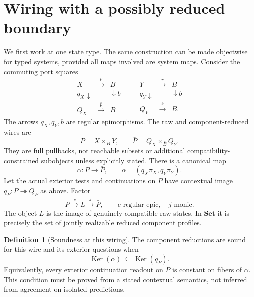 \documentclass[11pt]{article}
\theoremstyle{definition}
\newtheorem{definition}[theorem]{Definition}
\theoremstyle{remark}\newtheorem{remark}[theorem]{Remark}
\newcommand{\Ker}{\operatorname{Ker}}
\begin{document}
\section{Wiring with a possibly reduced boundary}
We first work at one state type. The same construction can be made
objectwise for typed systems, provided all maps involved are system maps.
Consider the commuting port squares
\[
\begin{array}{ccc}
X&\xrightarrow{p}&B\\
{\scriptstyle q_X}\downarrow&&\downarrow{\scriptstyle b}\\
Q_X&\xrightarrow{\bar p}&\bar B
\end{array}
\qquad
\begin{array}{ccc}
Y&\xrightarrow{r}&B\\
{\scriptstyle q_Y}\downarrow&&\downarrow{\scriptstyle b}\\
Q_Y&\xrightarrow{\bar r}&\bar B .
\end{array}
\]
The arrows $q_X,q_Y,b$ are regular epimorphisms. The raw and
component-reduced wires are
\begin{equation}\label{g:eq:wire}
 P=X\times_B Y,\qquad \bar P=Q_X\times_{\bar B}Q_Y.
\end{equation}
They are full pullbacks, not reachable subsets or additional
compatibility-constrained subobjects unless explicitly stated.
There is a canonical map
\[
 \alpha:P\longrightarrow\bar P,\qquad
 \alpha=(q_X\pi_X,q_Y\pi_Y).
\]
Let the actual exterior tests and continuations on $P$ have contextual
image $q_P:P\twoheadrightarrow Q_P$ as above. Factor
\begin{equation}\label{g:eq:alpha-image}
 P\xrightarrow{e}L\xrightarrow{j}\bar P,
 \qquad e\text{ regular epic},\quad j\text{ monic}.
\end{equation}
The object $L$ is the image of genuinely compatible raw states. In
$\mathbf{Set}$ it is precisely the set of jointly realizable reduced
component profiles.

\begin{definition}[Soundness at this wiring]\label{g:def:sound}
The component reductions are sound for this wire and its exterior questions
when
\begin{equation}\label{g:eq:sound}
 \Ker(\alpha)\ \subseteq\ \Ker(q_P).
\end{equation}
Equivalently, every exterior continuation readout on $P$ is constant on
fibers of $\alpha$. This condition must be proved from a stated contextual
semantics, not inferred from agreement on isolated predictions.
\end{definition}
\end{document}
